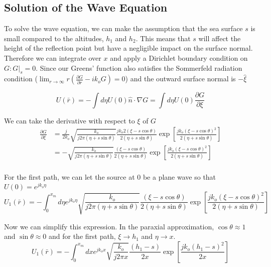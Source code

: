 \subsection{Solution of the Wave Equation}
To solve the wave equation, we can make the assumption that the sea surface $s$ is small compared to the altitudes, $h_1$ and $h_2$. This means that $s$ will affect the height of the reflection point but have a negligible impact on the surface normal. Therefore we can integrate over $x$ and apply a Dirichlet boundary condition on $G: G|_s = 0$. Since our Greens' function also satisfies the Sommerfeld radiation condition ($\lim_{r\rightarrow\infty} r\left(\frac{\partial G}{\partial r} -ik_oG\right)= 0$) and the outward surface normal is $-\hat{\xi}$

\begin{equation}
U(\bar{r}) = -\int d\eta U(0) \hat{n} \cdot \nabla G = \int d\eta U(0) \frac{\partial G}{\partial \xi}
\label{mp_eq:12a}
\end{equation}

We can take the derivative with respect to $\xi$ of $G$
\begin{equation}
\begin{aligned}
\frac{\partial G}{\partial \xi} &= \frac{j}{2k_o}\sqrt{\frac{k_o}{j2\pi(\eta+s\sin\theta)}}\frac{jk_o2(\xi-s\cos\theta)}{2(\eta+s\sin\theta)}\exp\left[\frac{jk_o(\xi-s\cos\theta)^2}{2(\eta+s\sin\theta)}\right]\\
&= -\sqrt{\frac{k_o}{j2\pi(\eta+s\sin\theta)}}\frac{(\xi-s\cos\theta)}{2(\eta+s\sin\theta)}\exp\left[\frac{jk_o(\xi-s\cos\theta)^2}{2(\eta+s\sin\theta)}\right]\\
\end{aligned}
\label{mp_eq:12b}
\end{equation}

For the first path, we can let the source at $0$ be a plane wave so that $U(0) = e^{jk_o\eta}$
\begin{equation}
U_1(\bar{r}) =  -\int_{0} ^{x_m} d\eta e^{jk_o\eta} \sqrt{\frac{k_o}{j2\pi(\eta+s\sin\theta)}}\frac{(\xi-s\cos\theta)}{2(\eta+s\sin\theta)}\exp\left[\frac{jk_o(\xi-s\cos\theta)^2}{2(\eta+s\sin\theta)}\right]
\label{mp_eq:12c}
\end{equation}

Now we can simplify this expression. In the paraxial approximation, $\cos\theta \approx 1$ and $\sin\theta \approx 0$ and for the first path, $\xi \rightarrow h_1$ and $\eta\rightarrow x$.
\begin{equation}
U_1(\bar{r}) =  -\int_{0} ^{x_m} dx e^{jk_ox} \sqrt{\frac{k_o}{j2\pi x}}\frac{(h_1-s)}{2x}\exp\left[\frac{jk_o(h_1-s)^2}{2x}\right]
\label{mp_eq:12d}
\end{equation}


